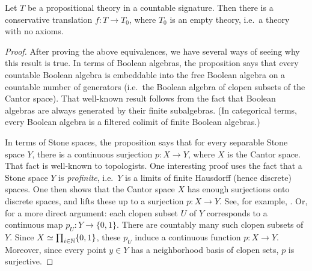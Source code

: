 \begin{prop} Let $T$ be a propositional theory in a countable
  signature.  Then there is a conservative translation $f:T\to T_0$,
  where $T_0$ is an empty theory, i.e.\ a theory with no
  axioms. \label{charity} \end{prop}

\begin{proof} After proving the above equivalences, we have several
  ways of seeing why this result is true.  In terms of Boolean
  algebras, the proposition says that every countable Boolean algebra
  is embeddable into the free Boolean algebra on a countable number of
  generators (i.e.\ the Boolean algebra of clopen subsets of the
  Cantor space).  That well-known result follows from the fact that
  Boolean algebras are always generated by their finite subalgebras.
  (In categorical terms, every Boolean algebra is a filtered colimit
  of finite Boolean algebras.)

  In terms of Stone spaces, the proposition says that for every
  separable Stone space $Y$, there is a continuous surjection
  $p:X\to Y$, where $X$ is the Cantor space.  That fact is well-known
  to topologists.  One interesting proof uses the fact that a Stone
  space $Y$ is {\it profinite}, i.e.\ $Y$ is a limits of finite
  Hausdorff (hence discrete) spaces.  One then shows that the Cantor
  space $X$ has enough surjections onto discrete spaces, and lifts
  these up to a surjection $p:X\to Y$.  See, for example,
  \cite{ribes}.  Or, for a more direct argument: each clopen subset
  $U$ of $Y$ corresponds to a continuous map $p_U:Y\to \{ 0,1\}$.
  There are countably many such clopen subsets of $Y$.  Since
  $X\simeq \prod_{i\in\mathbb N}\{ 0,1\}$, these $p_U$ induce a continuous
  function $p:X\to Y$.  Moreover, since every point $y\in Y$ has a
  neighborhood basis of clopen sets, $p$ is surjective.
\end{proof}

